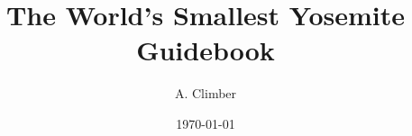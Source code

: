 \title{The World's Smallest Yosemite Guidebook}
\author{A. Climber}
\date{\today}
\def\publisher{Jolly Roger Press}
\def\publisherlogo{jr_press.png}
\def\bookedition{First}
\def\coverimage{Cover.jpg}
\def\backcoverimage{Back.jpg}
\def\heightunit{'}
